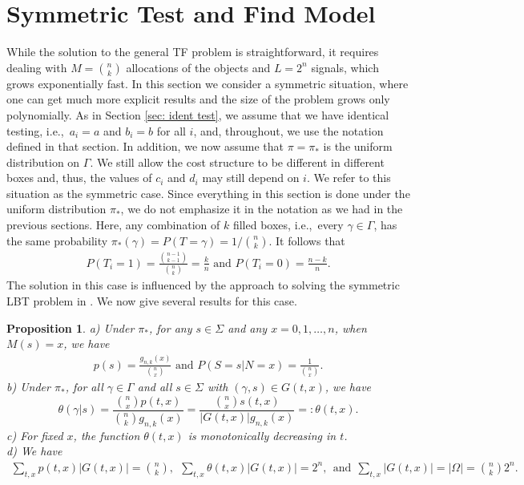 \documentclass[a4paper,11pt]{article}
\newtheorem{prop}{Proposition}
\newcommand{\dst}{distribution }
\begin{document}
\section{Symmetric Test and Find Model} \label{sec: STF}

While the solution to the general TF problem is straightforward, it requires dealing with $M={n \choose k}$ allocations of the objects and $L=2^n$ signals, which grows exponentially fast.  In this section we consider a symmetric situation, where one can get much more explicit results and the size of the problem grows only polynomially. As in Section \ref{sec: ident test}, we assume that we have identical testing, i.e.,\ $a_i=a$ and $b_i=b$ for all $i$, and, throughout, we use the notation defined in that section. In addition, we now assume that $\pi=\pi_*$ is the uniform \dst on $\Gamma$. We still allow the cost structure to be different in different boxes and, thus, the values of $c_i$ and $d_i$ may still depend on $i$. We refer to this situation as the symmetric case. Since everything in this section is done under the uniform distribution $\pi_*$, we do not emphasize it in the notation as we had in the previous sections. Here, any combination of $k$ filled boxes, i.e.,\ every $\gamma\in\Gamma$, has the same probability $\pi_*(\gamma) = P(T=\gamma)=1/\binom{n}{k}$. It follows that
\begin{eqnarray}\label{eq: uncond prob Ti}
P(T_i=1)=\frac{\binom{n-1}{k-1}}{\binom{n}{k}}=\frac{k}{n} \mbox{ and }  P(T_i=0)=\frac{n-k}{n}.
\end{eqnarray}
The solution in this case is influenced by the approach to solving the symmetric LBT problem in \cite{son25}. We now give several results for this case.

\begin{prop}\label{Lem1b}
a) Under $\pi_*$, for any $s\in\Sigma$ and any $x=0,1,\dots,n$, when $M(s)=x$, we have
\begin{eqnarray}
p(s) = \frac{g_{n,k}(x)}{\binom{n}{x}} \mbox{ and } P(S=s|N=x)=\frac{1}{\binom{n}{x}}.
 \label{psx}
\end{eqnarray}
b) Under $\pi_*$, for all $\gamma \in \Gamma$ and all $s\in\Sigma$ with $(\gamma,s)\in G(t,x)$, we have
$$
\theta(\gamma|s)= \frac{{n\choose x} p(t,x)}{{n\choose k} g_{n,k}(x)} =\frac{\binom{n}{x}s(t,x)}{|G(t,x)|g_{n,k}(x)}=: \theta(t,x).
$$
c) For fixed $x$, the function $\theta(t,x)$ is monotonically decreasing in $t$. \\
d) We have 
\begin{eqnarray*} 
 \sum_{t,x} p(t,x)|G(t,x)|=\binom{n}{k} , \ \ \sum_{t,x} \theta(t,x)|G(t,x)|=2^n, 
 \ \ \mbox{and} \ \ \sum_{t,x}|G(t,x)|=|\Omega|=\binom{n}{k}2^n.
\end{eqnarray*}
\end{prop}
\end{document}
